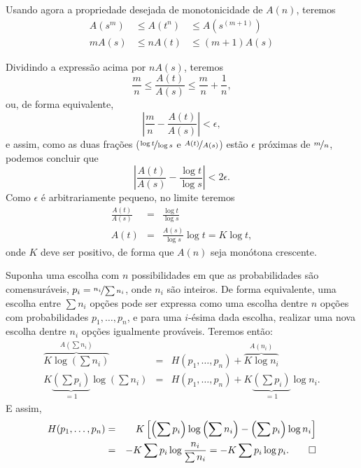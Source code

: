 \begin{frame}[allowframebreaks]
  Usando agora a propriedade desejada de monotonicidade de $A(n)$, teremos
  \begin{align}
  A(s^m) &\leq A(t^n) &\leq A(s^{(m+1)}) \\
  mA(s) &\leq nA(t) &\leq (m+1)A(s)
  \end{align}

  Dividindo a expressão acima por $nA(s)$, teremos
  \begin{equation}
  \frac{m}{n} \leq \frac{A(t)}{A(s)} \leq \frac{m}{n} + \frac{1}{n} ,
  \end{equation}
  ou, de forma equivalente,
  \begin{equation}
  \left\vert \frac{m}{n} - \frac{A(t)}{A(s)} \right\vert < \epsilon ,
  \end{equation}
  e assim, como as duas frações ($\nicefrac{\log t}{\log s}$ e $\nicefrac{A(t)}{A(s)}$) estão $\epsilon$ próximas
  de $\nicefrac{m}{n}$, podemos concluir que
  \begin{equation}
  \left\vert \frac{A(t)}{A(s)} - \frac{\log t}{\log s} \right\vert < 2\epsilon .
  \end{equation}
  Como $\epsilon$ é arbitrariamente pequeno, no limite teremos
  \begin{eqnarray}
  \frac{A(t)}{A(s)} &=& \frac{\log t}{\log s} \\
  A(t) &=& \frac{A(s)}{\log s} \log t = K \log t ,
  \end{eqnarray}
  onde $K$ deve ser positivo, de forma que $A(n)$ seja monótona crescente.

  Suponha uma escolha com $n$ possibilidades em que as probabilidades são comensuráveis,
  $p_i = \nicefrac{n_i}{\sum n_i}$, onde $n_i$ são inteiros. De forma equivalente,
  uma escolha entre $\sum n_i$ opções pode ser expressa como uma escolha dentre $n$ opções
  com probabilidades $p_1, \ldots, p_n$, e para uma $i$-ésima dada escolha, realizar uma
  nova escolha dentre $n_i$ opções igualmente prováveis. Teremos então:
  \begin{eqnarray}
  \overbrace{ K \log \left( \sum n_i \right) }^{A\left( \sum n_i \right)} &=& H(p_1, \ldots, p_n) + \overbrace{ K \log n_i }^{A(n_i)}\\
  K \underbrace{\left( \sum p_i \right)}_{=1} \log \left( \sum n_i \right) &=& H(p_1, \ldots, p_n) + K \underbrace{\left( \sum p_i \right)}_{=1} \log n_i .
  \end{eqnarray}  
  E assim,
  \begin{eqnarray}
  H(p_1, \ldots, p_n) &=& K\left[ \left( \sum p_i \right) \log \left( \sum n_i \right) - \left( \sum p_i \right) \log n_i \right] \\
        &=& -K \sum p_i \log \frac{n_i}{\sum n_i} = -K \sum p_i \log p_i . \qed
  \end{eqnarray} 
\end{frame}


